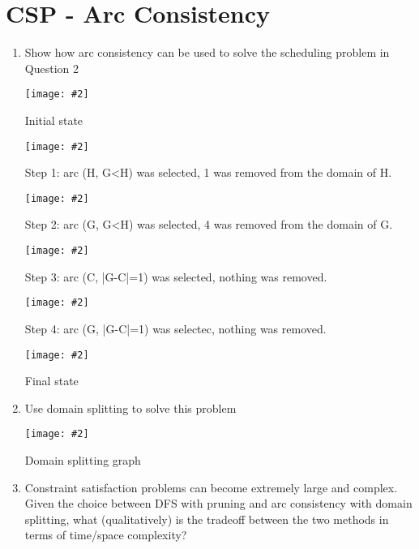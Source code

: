 \documentclass{article}
\def\ans#1{{\color{ans}#1}}
\newcommand{\centerfig}[2]{\begin{center}\texttt{[image: \#2]}\end{center}}
\begin{document}
\section{CSP - Arc Consistency}
\begin{enumerate}[label=(\alph*)]
    \item Show how arc consistency can be used to solve the scheduling problem in Question 2
    \centerfig{0.7}{../figs/q3_a_1.jpeg}
    {
        \begin{center}\color{ans}
            Initial state
        \end{center}
    }
    \centerfig{0.7}{../figs/q3_a_2.jpeg}
    {
        \begin{center}\color{ans}
            Step 1: arc (H, G<H) was selected, 1 was removed from the domain of H.
        \end{center}
    }
    \centerfig{0.7}{../figs/q3_a_3.jpeg}
    {
        \begin{center}\color{ans}
            Step 2: arc (G, G<H) was selected, 4 was removed from the domain of G.
        \end{center}
    }
    \centerfig{0.7}{../figs/q3_a_4.jpeg}
    {
        \begin{center}\color{ans}
            Step 3: arc (C, |G-C|=1) was selected, nothing was removed.
        \end{center}
    }
    \centerfig{0.7}{../figs/q3_a_2.jpeg}
    {
        \begin{center}\color{ans}
            Step 4: arc (G, |G-C|=1) was selectec, nothing was removed.
        \end{center}
    }
    \centerfig{0.7}{../figs/q3_a_6.jpeg}
    {
        \begin{center}\color{ans}
            Final state
        \end{center}
    }
    \item Use domain splitting to solve this problem
    \centerfig{0.8}{../figs/q3_b.png}
    {
        \begin{center}\color{ans}
            Domain splitting graph
        \end{center}
    }
    \item Constraint satisfaction problems can become extremely large and complex. Given the choice between DFS with pruning and arc consistency with domain splitting, what (qualitatively) is the tradeoff between the two methods in terms of time/space complexity? \\ \\
    \ans{
}
\end{enumerate}
\end{document}
